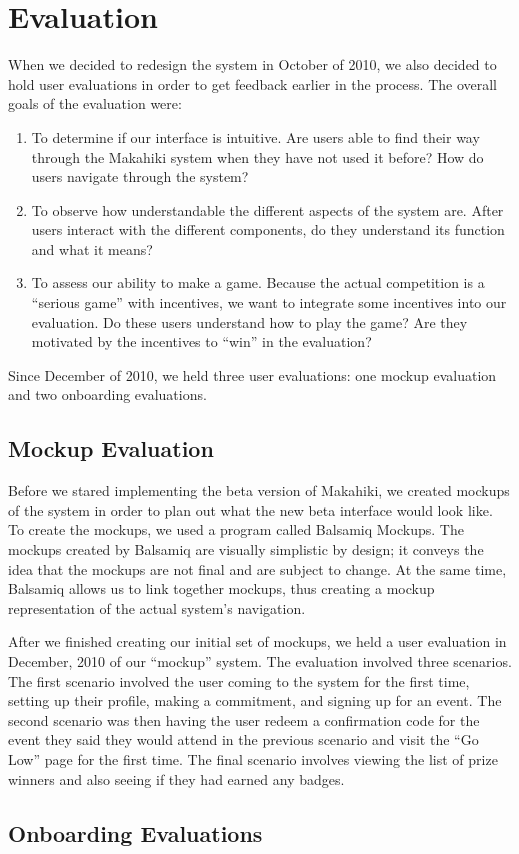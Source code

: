 \chapter{Evaluation}
\label{eval}

When we decided to redesign the system in October of 2010, we also decided to hold user evaluations in order to get feedback earlier in the process.  The overall goals of the evaluation were:

\begin{enumerate}
  \item To determine if our interface is intuitive.  Are users able to find their way through the Makahiki system when they have not used it before?  How do users navigate through the system?
  \item To observe how understandable the different aspects of the system are.  After users interact with the different components, do they understand its function and what it means?
  \item To assess our ability to make a game.  Because the actual competition is a ``serious game'' with incentives, we want to integrate some incentives into our evaluation.  Do these users understand how to play the game?  Are they motivated by the incentives to ``win'' in the evaluation?
\end{enumerate}  

Since December of 2010, we held three user evaluations: one mockup evaluation and two onboarding evaluations.  

\section{Mockup Evaluation}
\label{eval-mockup}

Before we stared implementing the beta version of Makahiki, we created mockups of the system in order to plan out what the new beta interface would look like. To create the mockups, we used a program called Balsamiq Mockups\cite{balsamiq-mockup}.  The mockups created by Balsamiq are visually simplistic by design; it conveys the idea that the mockups are not final and are subject to change.  At the same time, Balsamiq allows us to link together mockups, thus creating a mockup representation of the actual system's navigation.

After we finished creating our initial set of mockups, we held a user evaluation in December, 2010 of our ``mockup'' system.  The evaluation involved three scenarios.  The first scenario involved the user coming to the system for the first time, setting up their profile, making a commitment, and signing up for an event.  The second scenario was then having the user redeem a confirmation code for the event they said they would attend in the previous scenario and visit the ``Go Low'' page for the first time.  The final scenario involves viewing the list of prize winners and also seeing if they had earned any badges.

\section{Onboarding Evaluations}
\label{eval-onboarding}

